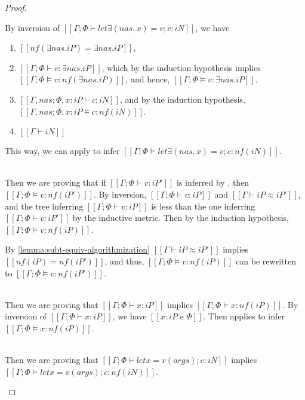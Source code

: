 \begin{proof}
\begin{caseof}
            By inversion of $[[Γ ; Φ ⊢ let∃ (nas, x) = v; c : iN]]$, we have
            \begin{enumerate}
                \item $[[nf(∃nas.iP) = ∃nas.iP]]$,
                \item $[[Γ ; Φ ⊢ v : ∃nas.iP]]$, 
                    which by the induction hypothesis implies 
                    $[[Γ ; Φ ⊨ v : nf(∃nas.iP)]]$, 
                    and hence, $[[Γ ; Φ ⊨ v : ∃nas.iP]]$.
                \item $[[Γ, nas ; Φ, x:iP ⊢ c : iN]]$,
                    and by the induction hypothesis, 
                    $[[Γ, nas ; Φ, x:iP ⊨ c : nf(iN)]]$.
                \item $[[Γ ⊢ iN]]$
            \end{enumerate}
            
            This way, we can apply  to
            infer $[[Γ ; Φ ⊨ let∃ (nas, x) = v; c : nf(iN)]]$.

                

        \item {}\\
            Then we are proving that
            if $[[Γ; Φ ⊢ v : iP']]$ is inferred by ,
            then $[[Γ; Φ ⊨ v : nf(iP')]]$.
            By inversion, $[[Γ ; Φ ⊢ v : iP]]$ and $[[Γ ⊢ iP ≈ iP']]$,
            and the tree inferring $[[Γ ; Φ ⊢ v : iP]]$ is less than the one 
            inferring $[[Γ; Φ ⊢ v : iP']]$ by the inductive metric.
            Then by the induction hypothesis, $[[Γ; Φ ⊨ v : nf(iP)]]$.

            By \cref{lemma:subt-equiv-algorithmization}
            $[[Γ ⊢ iP ≈ iP']]$ implies $[[nf(iP) = nf(iP')]]$, and thus, 
            $[[Γ; Φ ⊨ v : nf(iP)]]$ can be rewritten to $[[Γ; Φ ⊨ v : nf(iP')]]$.

        \item {}\\
            Then we are proving that
            $[[Γ; Φ ⊢ x : iP]]$
            implies
            $[[Γ; Φ ⊨ x : nf(iP)]]$.
            By inversion of $[[Γ; Φ ⊢ x : iP]]$,
            we have $[[x : iP ∊ Φ ]]$.
            Then  applies to infer
            $[[Γ; Φ ⊨ x : nf(iP)]]$.

        \item {}\\
            Then we are proving that
            $[[Γ; Φ ⊢ let x = v(args); c : iN]]$
            implies
            $[[Γ; Φ ⊨ let x = v(args); c : nf(iN)]]$.


\end{caseof}
\end{proof}
